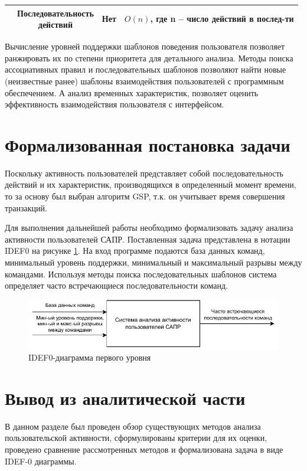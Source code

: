 \begin{table}[H]
\begin{center}
\begin{tabular}{ | c | c | c | c | }
			\specialcell{GOMS} & \specialcell{Последовательность\\действий} & Нет & \specialcell{$O(n)$, где n --\\число действий\\в послед-ти} \\ \hline
		\end{tabular}
	\end{center}
\end{table}

Вычисление уровней поддержки шаблонов поведения пользователя позволяет ранжировать их по степени приоритета для детального анализа.
Методы поиска ассоциативных правил и последовательных шаблонов позволяют найти новые (неизвестные ранее) шаблоны взаимодействия пользователей с программным обеспечением.
А анализ временных характеристик, позволяет оценить эффективность взаимодействия пользователя с интерфейсом.

\section{Формализованная постановка задачи}
Поскольку
активность пользователей представляет собой последовательность действий и их характеристик, производящихся в определенный момент времени, то за основу был выбран алгоритм GSP, т.к. он учитывает время совершения транзакций.

Для выполнения дальнейшей работы необходимо формализовать задачу анализа активности пользователей САПР. Поставленная задача представлена в нотации IDEF0 на рисунке \ref{idef0}. На вход программе подаются база данных команд, минимальный уровень поддержки, минимальный и максимальный разрывы между командами. Используя методы поиска последовательных шаблонов система определяет часто встречающиеся последовательности команд.

\begin{figure}[h!]
	\centering
	\includegraphics[width=1.0\textwidth]{inc/img/IDEF0.drawio.pdf}
	\caption{IDEF0-диаграмма первого уровня}
	\label{idef0}
\end{figure}

\section*{Вывод из аналитической части}

В данном разделе был проведен обзор существующих методов анализа пользовательской активности, сформулированы критерии для их оценки, проведено сравнение рассмотренных методов и формализована задача в виде IDEF-0 диаграммы.